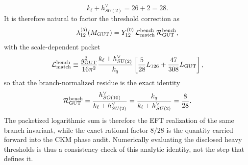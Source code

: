 \documentclass[11pt]{article}
\begin{document}
\begin{equation}
 k_{\ell}+h^{\vee}_{SU(2)}=26+2=28.
\end{equation}
It is therefore natural to factor the threshold correction as
\begin{equation}
 \lambda_{12}^{(5)}(M_{\rm GUT})
 =
 Y_{12}^{(0)}\,\mathcal L_{\rm match}^{\rm bench}\,\mathcal R_{\rm GUT}^{\rm bench},
\end{equation}
with the scale-dependent packet
\begin{equation}
 \mathcal L_{\rm match}^{\rm bench}
 \equiv
 \frac{g_{\rm GUT}^2}{16\pi^2}
 \frac{k_{\ell}+h^{\vee}_{SU(2)}}{k_q}
 \left[\frac{5}{28}L_{126}+\frac{47}{308}L_{\rm GUT}\right],
\end{equation}
so that the branch-normalized residue is the exact identity
\begin{equation}
 \mathcal R_{\rm GUT}^{\rm bench}
 =
 \frac{h^{\vee}_{SO(10)}}{k_{\ell}+h^{\vee}_{SU(2)}}
 =
 \frac{k_q}{k_{\ell}+h^{\vee}_{SU(2)}}
 =
 \frac{8}{28}.
\end{equation}
The packetized logarithmic sum is therefore the EFT realization of the same branch invariant, while the exact rational factor $8/28$ is the quantity carried forward into the CKM phase audit. Numerically evaluating the disclosed heavy thresholds is thus a consistency check of this analytic identity, not the step that defines it.
\end{document}
